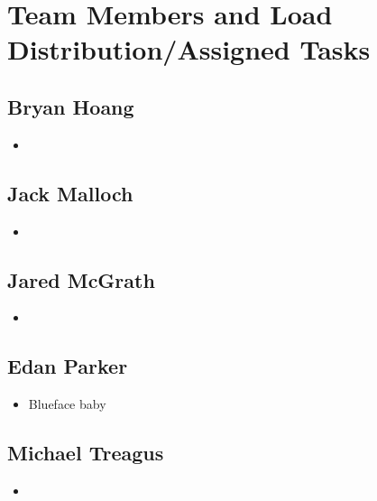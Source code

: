 \documentclass[../mthe-493-project-proposal.tex]{subfiles}
\begin{document}
    \chapter{Team Members and Load Distribution/Assigned Tasks}
    \label{ch:team-load-distribution}

    \section{Bryan Hoang}
    \begin{itemize}
        \item
    \end{itemize}

    \section{Jack Malloch}
    \begin{itemize}
        \item
    \end{itemize}

    \section{Jared McGrath}
    \begin{itemize}
        \item
    \end{itemize}

    \section{Edan Parker}
    \begin{itemize}
        \item Blueface baby
    \end{itemize}

    \section{Michael Treagus}
    \begin{itemize}
        \item
    \end{itemize}
\end{document}
